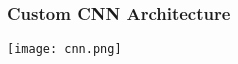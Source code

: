 \documentclass[../presentation.tex]{subfiles} %
\begin{document}
\begin{frame}
    
    \frametitle{Custom CNN Architecture}

        \vspace{-0.7cm}
        \begin{center}
            \texttt{[image: cnn.png]}
        \end{center}
        \vspace{-0.4cm}








\end{frame}
\end{document}
